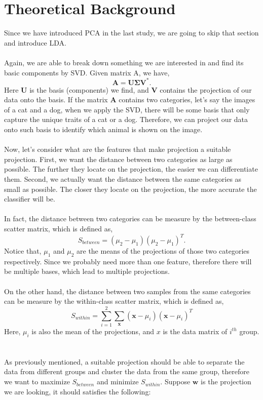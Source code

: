 \documentclass{article}
\begin{document}
\section{Theoretical Background}
Since we have introduced PCA in the last study, we are going to skip that section and introduce LDA. \\
~\\
Again, we are able to break down something we are interested in and find its basic components by SVD. Given matrix A, we have, 
\[
\mathbf{A} = \mathbf{U\Sigma V^*}.
\]
Here $\mathbf{U}$ is the basis (components) we find, and $\mathbf{V}$ contains the projection of our data onto the basis. If the matrix $\mathbf{A}$ contains two categories, let's say the images of a cat and a dog, when we apply the SVD, there will be some basis that only capture the unique traits of a cat or a dog. Therefore, we can project our data onto such basis to identify which animal is shown on the image. \\
~\\
Now, let's consider what are the features that make projection a suitable projection. First, we want the distance between two categories as large as possible. The further they locate on the projection, the easier we can differentiate them. Second, we actually want the distance between the same categories as small as possible. The closer they locate on the projection, the more accurate the classifier will be. \\
~\\
In fact, the distance between two categories can be measure by the between-class scatter matrix, which is defined as,
\[
S_{between} = (\mu_2 - \mu_1)(\mu_2 - \mu_1)^T.
\]
Notice that, $\mu_1$ and $\mu_2$ are the means of the projections of those two categories respectively. Since we probably need more than one feature, therefore there will be multiple bases, which lead to multiple projections.\\
~\\
On the other hand, the distance between two samples from the same categories can be measure by the within-class scatter matrix, which is defined as,
\[
S_{within} = \sum_{i=1}^2\sum_{\mathbf{x}}(\mathbf{x}-\mu_i)(\mathbf{x}-\mu_i)^T
\]
Here, $\mu_i$ is also the mean of the projections, and $x$ is the data matrix of $i^{th}$ group. ~\\
\\
As previously mentioned, a suitable projection should be able to separate the data from different groups and cluster the data from the same group, therefore we want to maximize $S_{between}$ and minimize $S_{within}$. Suppose $\mathbf{w}$ is the projection we are looking, it should satisfies the following:
\end{document}
